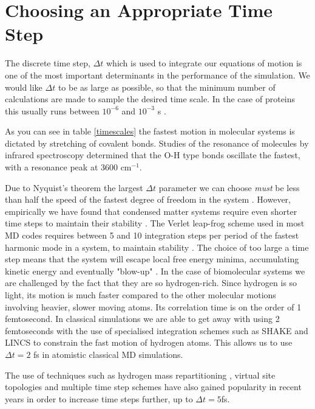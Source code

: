 \section{Choosing an Appropriate Time Step}
The discrete time step, $\Delta t$ which is used to integrate our equations of motion is one of the most important determinants in the performance of the simulation. We would like $\Delta t$ to be as large as possible, so that the minimum number of calculations are made to sample the desired time scale. In the case of proteins this usually runs between $10^{-6}$ and $10^{-3}$ s \cite{robustelli2022}.  

As you can see in table \ref{timescales} the fastest motion in molecular systems is dictated by stretching of covalent bonds. Studies of the resonance of molecules by infrared spectroscopy determined that the O-H type bonds oscillate the fastest, with a resonance peak at 3600 cm$^{-1}$\cite{schlick2010}. 

Due to Nyquist's theorem the largest $\Delta t$ parameter we can choose \textit{must} be less than half the speed of the fastest degree of freedom in the system \cite{shannon1949}. However, empirically we have found that condensed matter systems require even shorter time steps to maintain their stability \cite{leach2001}. The Verlet leap-frog scheme used in most MD codes requires between 5 and 10 integration steps per period of the fastest harmonic mode in a system, to maintain stability \cite{mazur1997}\cite{feenstra1999}. The choice of too large a time step means that the system will escape local free energy minima, accumulating kinetic energy and eventually "blow-up" \cite{braun2019}. In the case of biomolecular systems we are challenged by the fact that they are so hydrogen-rich. Since hydrogen is so light, its motion is much faster compared to the other molecular motions involving heavier, slower moving atoms. Its correlation time is on the order of 1 femtosecond. In classical simulations we are able to get away with using 2 femtoseconds with the use of specialised integration schemes such as SHAKE\cite{andersen1983} and LINCS\cite{hess1997} to constrain the fast motion of hydrogen atoms. This allows us to use $\Delta t = 2$ fs in atomistic classical MD simulations.

The use of techniques such as hydrogen mass repartitioning \cite{balusek2019}, virtual site topologies \cite{feenstra1999} and multiple time step schemes \cite{streett1978} have also gained popularity in recent years in order to increase time steps further, up to $\Delta t = 5 $fs. 


